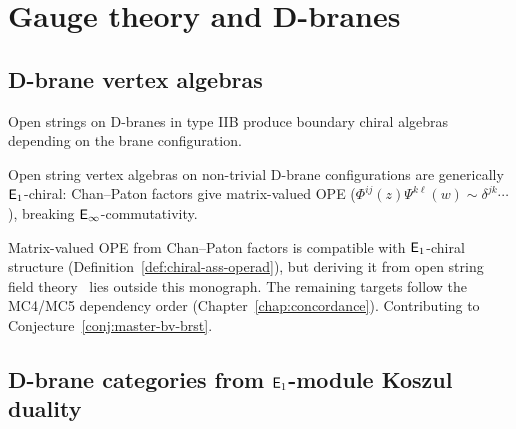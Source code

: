 \section{Gauge theory and D-branes}
\label{sec:gauge-d-branes}
\subsection{D-brane vertex algebras}

\begin{construction}\label{constr:open-string-voa}
Open strings on D-branes in type IIB produce boundary chiral algebras depending on the brane configuration.
\end{construction}

\begin{conjecture}\label{conj:dbrane-e1}
Open string vertex algebras on non-trivial D-brane configurations are generically $\mathsf{E}_1$-chiral: Chan--Paton factors give matrix-valued OPE ($\Phi^{ij}(z)\Psi^{k\ell}(w) \sim \delta^{jk}\cdots$), breaking $\mathsf{E}_{\infty}$-commutativity.
\end{conjecture}

\begin{remark}[Scope]
Matrix-valued OPE from Chan--Paton factors is compatible with $\mathsf{E}_1$-chiral structure (Definition~\ref{def:chiral-ass-operad}), but deriving it from open string field theory~\cite{Zwi93} lies outside this monograph.  The remaining targets follow the MC4/MC5 dependency order (Chapter~\ref{chap:concordance}).  Contributing to Conjecture~\ref{conj:master-bv-brst}.
\end{remark}


\subsection{\texorpdfstring{D-brane categories from $\mathsf{E}_1$-module Koszul duality}{D-brane categories from E1-module Koszul duality}}

